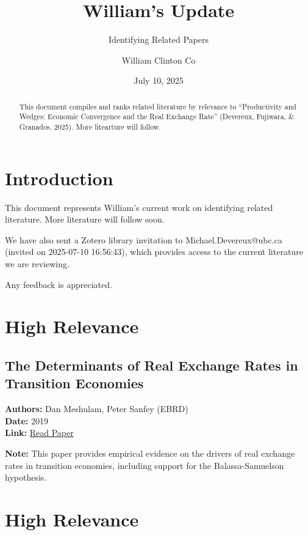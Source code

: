 \documentclass[
  11pt,
]{article}
\title{William's Update}
\subtitle{Identifying Related Papers}
\author{William Clinton Co}
\date{July 10, 2025}
\renewcommand*\contentsname{Table of contents}
\newcommand\contentsname{Table of contents}
\begin{document}
\maketitle
\begin{abstract}
This document compiles and ranks related literature by relevance to
``Productivity and Wedges: Economic Convergence and the Real Exchange
Rate'' (Devereux, Fujiwara, \& Granados, 2025). More litearture will
follow.
\end{abstract}

\renewcommand*\contentsname{Table of contents}
{
\hypersetup{linkcolor=}
\setcounter{tocdepth}{3}
\tableofcontents
}

\section{Introduction}\label{introduction}

This document represents William's current work on identifying related
literature. More literature will follow soon.

We have also sent a Zotero library invitation to Michael.Devereux@ubc.ca
(invited on 2025-07-10 16:56:43), which provides access to the current
literature we are reviewing.

Any feedback is appreciated.

\section{High Relevance}\label{high-relevance}

\subsection{The Determinants of Real Exchange Rates in Transition
Economies}\label{the-determinants-of-real-exchange-rates-in-transition-economies}

\textbf{Authors:} Dan Meshulam, Peter Sanfey (EBRD)\\
\textbf{Date:} 2019\\
\textbf{Link:}
\href{https://drive.google.com/file/d/1MldCJB2yPD3AEI93kt9qSX11rjcTdySo/view?usp=sharing}{Read
Paper}

\textbf{Note:} This paper provides empirical evidence on the drivers of
real exchange rates in transition economies, including support for the
Balassa-Samuelson hypothesis.

\section{High Relevance}\label{high-relevance-1}
\end{document}
